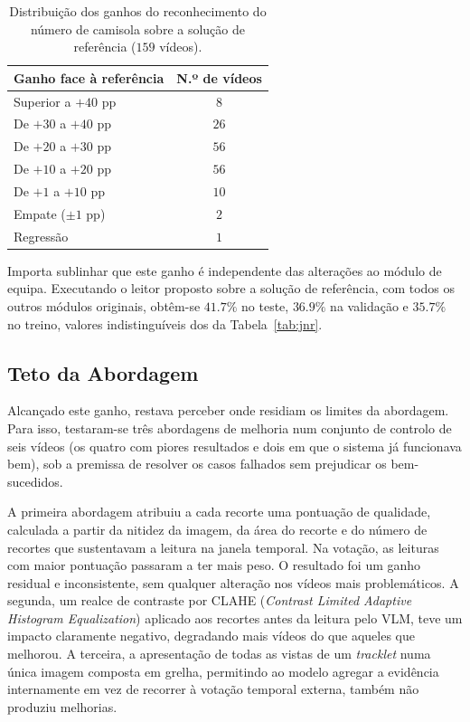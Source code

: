 \begin{table}[htbp]
    \centering
    \caption{Distribuição dos ganhos do reconhecimento do número de camisola sobre a solução de
    referência ($159$ vídeos).}
    \label{tab:jnr-distribuicao}
    \begin{tabular}{|l|c|}
        \hline
        \textbf{Ganho face à referência} & \textbf{N.º de vídeos} \\
        \hline
        Superior a $+40$ pp & $8$ \\
        \hline
        De $+30$ a $+40$ pp & $26$ \\
        \hline
        De $+20$ a $+30$ pp & $56$ \\
        \hline
        De $+10$ a $+20$ pp & $56$ \\
        \hline
        De $+1$ a $+10$ pp  & $10$ \\
        \hline
        Empate ($\pm 1$ pp) & $2$ \\
        \hline
        Regressão           & $1$ \\
        \hline
    \end{tabular}
\end{table}

Importa sublinhar que este ganho é independente das alterações ao módulo de equipa. Executando o
leitor proposto sobre a solução de referência, com todos os outros módulos originais, obtêm-se
$41.7\%$ no teste, $36.9\%$ na validação e $35.7\%$ no treino, valores
indistinguíveis dos da Tabela~\ref{tab:jnr}.

\subsection{Teto da Abordagem}\label{sec:res_jnr_teto}

Alcançado este ganho, restava perceber onde residiam os limites da abordagem. Para isso, testaram-se
três abordagens de melhoria num conjunto de controlo de seis vídeos (os quatro com piores resultados
e dois em que o sistema já funcionava bem), sob a premissa de resolver os casos falhados sem
prejudicar os bem-sucedidos.

A primeira abordagem atribuiu a cada recorte uma pontuação de qualidade, calculada a partir da nitidez
da imagem, da área do recorte e do número de recortes que sustentavam a leitura na janela temporal.
Na votação, as leituras com maior pontuação passaram a ter mais peso. O resultado foi um ganho
residual e inconsistente, sem qualquer alteração nos vídeos mais problemáticos. A segunda, um realce
de contraste por CLAHE (\emph{Contrast Limited Adaptive Histogram Equalization}) aplicado aos
recortes antes da leitura pelo VLM, teve um impacto claramente negativo, degradando mais vídeos do
que aqueles que melhorou. A terceira, a apresentação de todas as vistas de um \emph{tracklet} numa
única imagem composta em grelha, permitindo ao modelo agregar a evidência internamente em vez de
recorrer à votação temporal externa, também não produziu melhorias.

